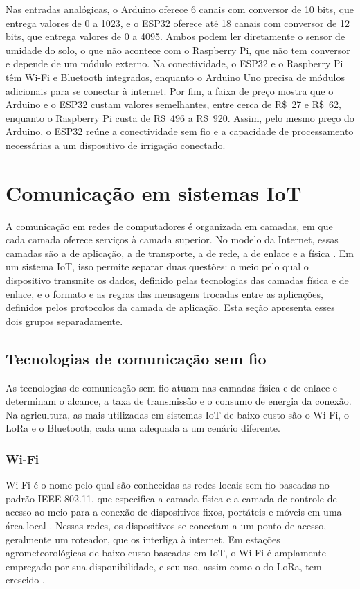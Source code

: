 Nas entradas analógicas, o Arduino oferece 6 canais com conversor de 10 bits, que entrega valores de 0 a 1023, e o ESP32 oferece até 18 canais com conversor de 12 bits, que entrega valores de 0 a 4095. Ambos podem ler diretamente o sensor de umidade do solo, o que não acontece com o Raspberry Pi, que não tem conversor e depende de um módulo externo. Na conectividade, o ESP32 e o Raspberry Pi têm Wi-Fi e Bluetooth integrados, enquanto o Arduino Uno precisa de módulos adicionais para se conectar à internet. Por fim, a faixa de preço mostra que o Arduino e o ESP32 custam valores semelhantes, entre cerca de R\$~27 e R\$~62, enquanto o Raspberry Pi custa de R\$~496 a R\$~920. Assim, pelo mesmo preço do Arduino, o ESP32 reúne a conectividade sem fio e a capacidade de processamento necessárias a um dispositivo de irrigação conectado.

\section{Comunicação em sistemas IoT}
 
A comunicação em redes de computadores é organizada em camadas, em que cada camada oferece serviços à camada superior. No modelo da Internet, essas camadas são a de aplicação, a de transporte, a de rede, a de enlace e a física \cite{kurose2021}. Em um sistema IoT, isso permite separar duas questões: o meio pelo qual o dispositivo transmite os dados, definido pelas tecnologias das camadas física e de enlace, e o formato e as regras das mensagens trocadas entre as aplicações, definidos pelos protocolos da camada de aplicação. Esta seção apresenta esses dois grupos separadamente.
 
\subsection{Tecnologias de comunicação sem fio}
 
As tecnologias de comunicação sem fio atuam nas camadas física e de enlace e determinam o alcance, a taxa de transmissão e o consumo de energia da conexão. Na agricultura, as mais utilizadas em sistemas IoT de baixo custo são o Wi-Fi, o LoRa e o Bluetooth, cada uma adequada a um cenário diferente.
 
\subsubsection{Wi-Fi}
 
Wi-Fi é o nome pelo qual são conhecidas as redes locais sem fio baseadas no padrão IEEE 802.11, que especifica a camada física e a camada de controle de acesso ao meio para a conexão de dispositivos fixos, portáteis e móveis em uma área local \cite{ieee80211}. Nessas redes, os dispositivos se conectam a um ponto de acesso, geralmente um roteador, que os interliga à internet. Em estações agrometeorológicas de baixo custo baseadas em IoT, o Wi-Fi é amplamente empregado por sua disponibilidade, e seu uso, assim como o do LoRa, tem crescido \cite{alkalaany2025}.
 
